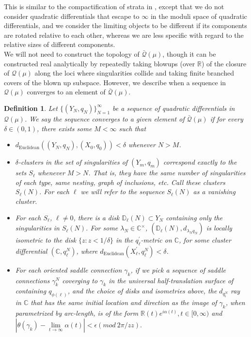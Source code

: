 \documentclass[12pt]{article}
\newtheorem{definition}[theorem]{Definition}
\newcommand{\rr}{\mathbb{R}}
\newcommand{\cc}{\mathbb{C}}
\begin{document}
\noindent This is similar to the compactification of strata in \cite{5guys}, except that we do not consider quadratic differentials that escape to $\infty$ in the moduli space of quadratic differentials, and we consider the limiting objects to be different if its components are rotated relative to each other, whereas we are less specific with regard to the relative sizes of different components.\\

\noindent We will not need to construct the topology of $\bar{\mathcal{Q}}(\mu)$, though it can be constructed real analytically by repeatedly taking blowups (over $\rr$) of the closure of $\mathcal{Q}(\mu)$ along the loci where singularities collide and taking finite branched covers of the blown up subspace. However, we describe when a sequence in $\mathcal{Q}(\mu)$ converges to an element of $\bar{\mathcal{Q}}(\mu)$.

\begin{definition}Let $\{(Y_N,q_N)\}_{N = 1}^\infty$ be a sequence of quadratic differentials in $\mathcal{Q}(\mu)$. We say the sequence converges to a given element of $\bar{\mathcal{Q}}(\mu)$ if for every $\delta \in (0,1)$, there exists some $M < \infty$ such that
\begin{itemize}
    \item $d_\mathrm{Euclidean}((Y_N,q_N),(X_0,q_0)) < \delta$ whenever $N > M$.
    \item $\delta$-clusters in the set of singularities of $(Y_m,q_m)$ correspond exactly to the sets $S_\ell$ whenever $M > N$. That is, they have the same number of singularities of each type, same nesting, graph of inclusions, etc. Call these clusters $S_\ell(N)$. For each $\ell$ we will refer to the sequence $S_\ell(N)$ as a \emph{vanishing cluster}.
    \item For each $S_\ell$, $\ell \neq 0$, there is a disk $\mathbb{D}_{\ell}(N) \subset Y_N$ containing only the singularities in $S_\ell(N)$. For some $\lambda_N \in \cc^\times$, $(\mathbb{D}_{\ell}(N), d_{\lambda_N q_N})$ is locally isometric to the disk $\{z: z < 1/\delta\}$ in the $q_\ell^\prime$-metric on $\cc$, for some cluster differential $(\cc,q_\ell^N)$, where $d_\mathrm{Euclidean}(X_\ell^\prime,q_\ell^N) < \delta$.
    \item For each oriented saddle connection $\gamma_k$, if we pick a sequence of saddle connections $\gamma_k^N$ coverging to $\gamma_k$ in the universal half-translation surface of containing $q_{\phi(\ell)}$, and the choice of disks and isometries above, the $d_{q_i^N}$ ray in $\cc$ that has the same initial location and direction as the image of $\gamma_k$, when parametrized by arc-length, is of the form $\rr(t) e^{i\alpha(t)}, t \in [0,\infty)$ and $|\theta(\gamma_k) - \lim\limits_{t \to \infty} \alpha(t)| < \epsilon (mod ~ 2\pi/zz).$
\end{itemize}
\end{definition}
\end{document}
